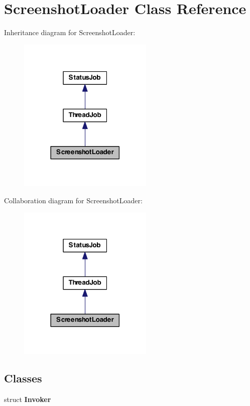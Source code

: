 \hypertarget{class_screenshot_loader}{\section{Screenshot\-Loader Class Reference}
\label{class_screenshot_loader}
}


Inheritance diagram for Screenshot\-Loader\-:
\nopagebreak
\begin{figure}[H]
\begin{center}
\leavevmode
\includegraphics[width=182pt]{class_screenshot_loader__inherit__graph}
\end{center}
\end{figure}


Collaboration diagram for Screenshot\-Loader\-:
\nopagebreak
\begin{figure}[H]
\begin{center}
\leavevmode
\includegraphics[width=182pt]{class_screenshot_loader__coll__graph}
\end{center}
\end{figure}
\subsection*{Classes}
\begin{DoxyCompactItemize}
\item 
struct {\bfseries Invoker}
\end{DoxyCompactItemize}
